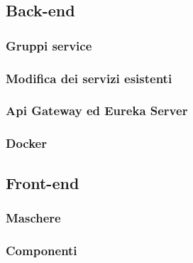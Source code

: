 \subsection{Back-end}

\subsubsection{Gruppi service}
\subsubsection{Modifica dei servizi esistenti}
\subsubsection{Api Gateway ed Eureka Server}
\subsubsection{Docker}

\subsection{Front-end}
\subsubsection{Maschere}
\subsubsection{Componenti}